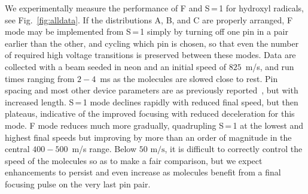 \documentclass[%
 reprint,
 amsmath,amssymb,
 aps,
prl,
]{revtex4-1}
\begin{document}
We experimentally measure the performance of F and S\,=\,1 for hydroxyl radicals, see Fig.~\ref{fig:alldata}.
If the distributions A, B, and C are properly arranged, F mode may be implemented from S\,=\,1 simply by turning off one pin in a pair earlier than the other, and cycling which pin is chosen, so that even the number of required high voltage transitions is preserved between these modes.
Data are collected with a beam seeded in neon and an initial speed of $825$~m/s, and run times ranging from $2-4$~ms as the molecules are slowed close to rest.
Pin spacing and most other device parameters are as previously reported~\cite{Bochinski2004,Sawyer2007}, but with increased length.
S\,=\,1 mode declines rapidly with reduced final speed, but then plateaus, indicative of the improved focusing with reduced deceleration for this mode.
F mode reduces much more gradually, quadrupling S\,=\,1 at the lowest and highest final speeds but improving by more than an order of magnitude in the central $400-500$~m/s range.
Below $50\text{ m/s}$, it is difficult to correctly control the speed of the molecules so as to make a fair comparison, but we expect enhancements to persist and even increase as molecules benefit from a final focusing pulse on the very last pin pair.
\end{document}
